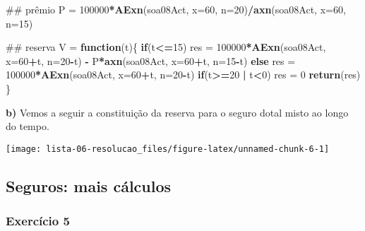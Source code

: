 \documentclass[]{article}
\newenvironment{Shaded}{\begin{snugshade}}{\end{snugshade}}
\newcommand{\ControlFlowTok}[1]{\textcolor[rgb]{0.13,0.29,0.53}{\textbf{#1}}}
\newcommand{\DataTypeTok}[1]{\textcolor[rgb]{0.13,0.29,0.53}{#1}}
\newcommand{\DecValTok}[1]{\textcolor[rgb]{0.00,0.00,0.81}{#1}}
\newcommand{\KeywordTok}[1]{\textcolor[rgb]{0.13,0.29,0.53}{\textbf{#1}}}
\newcommand{\NormalTok}[1]{#1}
\newcommand{\OperatorTok}[1]{\textcolor[rgb]{0.81,0.36,0.00}{\textbf{#1}}}
\newcommand{\StringTok}[1]{\textcolor[rgb]{0.31,0.60,0.02}{#1}}
\begin{document}
\begin{Shaded}
\begin{Highlighting}[]
\NormalTok{## prêmio}
\NormalTok{P =}\StringTok{ }\DecValTok{100000}\OperatorTok{*}\KeywordTok{AExn}\NormalTok{(soa08Act, }\DataTypeTok{x=}\DecValTok{60}\NormalTok{, }\DataTypeTok{n=}\DecValTok{20}\NormalTok{)}\OperatorTok{/}\KeywordTok{axn}\NormalTok{(soa08Act, }\DataTypeTok{x=}\DecValTok{60}\NormalTok{, }\DataTypeTok{n=}\DecValTok{15}\NormalTok{)}

\NormalTok{## reserva}
\NormalTok{V =}\StringTok{ }\ControlFlowTok{function}\NormalTok{(t)\{}
  \ControlFlowTok{if}\NormalTok{(t}\OperatorTok{<=}\DecValTok{15}\NormalTok{)}
\NormalTok{    res =}\StringTok{ }\DecValTok{100000}\OperatorTok{*}\KeywordTok{AExn}\NormalTok{(soa08Act, }\DataTypeTok{x=}\DecValTok{60}\OperatorTok{+}\NormalTok{t, }\DataTypeTok{n=}\DecValTok{20}\OperatorTok{-}\NormalTok{t) }\OperatorTok{-}\StringTok{ }\NormalTok{P}\OperatorTok{*}\KeywordTok{axn}\NormalTok{(soa08Act, }\DataTypeTok{x=}\DecValTok{60}\OperatorTok{+}\NormalTok{t, }\DataTypeTok{n=}\DecValTok{15}\OperatorTok{-}\NormalTok{t)}
  \ControlFlowTok{else}
\NormalTok{    res =}\StringTok{ }\DecValTok{100000}\OperatorTok{*}\KeywordTok{AExn}\NormalTok{(soa08Act, }\DataTypeTok{x=}\DecValTok{60}\OperatorTok{+}\NormalTok{t, }\DataTypeTok{n=}\DecValTok{20}\OperatorTok{-}\NormalTok{t)}
  \ControlFlowTok{if}\NormalTok{(t}\OperatorTok{>=}\DecValTok{20} \OperatorTok{|}\StringTok{ }\NormalTok{t}\OperatorTok{<}\DecValTok{0}\NormalTok{)}
\NormalTok{    res =}\StringTok{ }\DecValTok{0}
  \KeywordTok{return}\NormalTok{(res)}
\NormalTok{\}}
\end{Highlighting}
\end{Shaded}

\textbf{b)} Vemos a seguir a constituição da reserva para o seguro dotal
misto ao longo do tempo.

\begin{center}\texttt{[image: lista-06-resolucao\_files/figure-latex/unnamed-chunk-6-1]} \end{center}

\hypertarget{seguros-mais-calculos}{%
\subsection{Seguros: mais cálculos}\label{seguros-mais-calculos}}

\hypertarget{exercicio-5}{%
\subsubsection{Exercício 5}\label{exercicio-5}}
\end{document}
